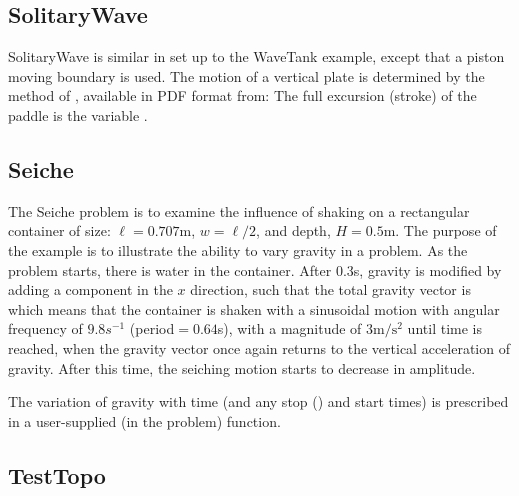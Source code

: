 \documentclass{../GPUSPHtemplate}
\begin{document}
\subsection{SolitaryWave}

SolitaryWave is similar in set up to the WaveTank example, except that a
piston moving boundary is used. The motion of a vertical plate is
determined by the method of \cite{goring_tsunamis_1979}, available in PDF format
from:
The full excursion (stroke) of the paddle is the variable .

\subsection{Seiche}

The Seiche problem is to examine the influence of shaking on a
rectangular container of size: $\ell = 0.707$m, $w = \ell/2$, and depth,
$H = 0.5$m. The purpose of the example is to illustrate the ability to
vary gravity in a problem. As the problem starts, there is water in the
container. After $0.3$s, gravity is modified by adding a component in
the $x$ direction, such that the total gravity vector is
\\ which means that the container is shaken with a sinusoidal
motion with angular frequency of $9.8s^{-1}$ (period${} = 0.64$s),
with a magnitude of $3\text{m}/\text{s}^2$ until time 
is reached, when the gravity vector once again returns to the vertical
acceleration of gravity. After this time, the seiching motion starts to
decrease in amplitude.

\iffalse
\begin{figure}[h]
\centering{%
\texttt{[image: Seiche.png]}%
}
\caption{Resonant seiching in a rectangular domain showing the results
of a time varying gravity in the problem, \cmd{Seiche.cc}. Here the tank has
been shaking side to side at the resonant frequency of $0.638$s. The
color coding is for the pressure in the fluid.}
\end{figure}
\else
\fi

The variation of gravity with time (and any stop () and
start times) is prescribed in a user-supplied (in the problem)
 function.

\subsection{TestTopo}
\end{document}
